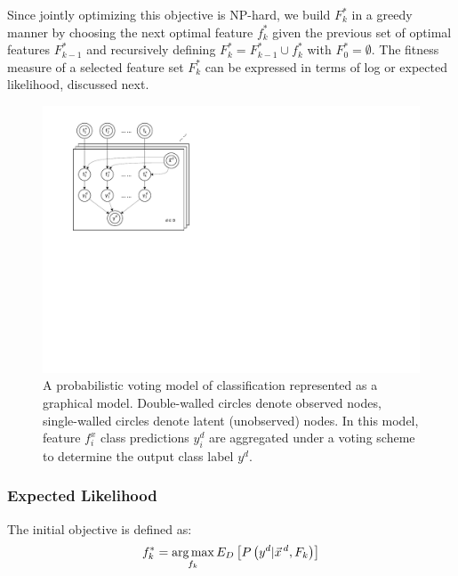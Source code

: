 Since jointly optimizing this objective is NP-hard, we build
$F_k^*$ in a greedy manner by choosing the next optimal feature $f^*_k$
given the previous set of optimal features $F^*_{k-1}$ and recursively
defining $F^*_k = F^*_{k-1}\cup f^*_k$ with $F^*_0 = \emptyset$. The
fitness measure of a selected feature set $F^*_k$ can be
expressed in terms of log or expected likelihood, discussed next.

\begin{figure}[tbp!]
	\centering
	\includegraphics[scale=0.9]{Plots_1.pdf}
	\caption{\footnotesize A probabilistic voting model of classification represented as a graphical model. 
Double-walled circles denote observed nodes, single-walled circles denote latent (unobserved) nodes.
In this model, feature $f_i^x$ class predictions $y_i^d$ are aggregated under a voting scheme to determine 
the output class label $y^d$.}
	\label{fig:model}
\end{figure}
\vspace{-3mm}


\COMMENT
\subsubsection{Expected Likelihood}
The initial objective is defined as:
\[f_k^*=\argmax_{f_k}E_D\left[P\left(y^d|\vec{x}^{\,d},F_k\right)\right]\]

